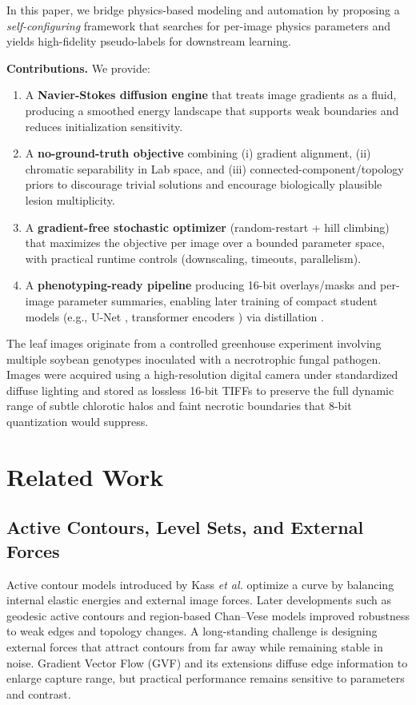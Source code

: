 \documentclass[11pt,a4paper]{article}
\begin{document}
In this paper, we bridge physics-based modeling and automation by proposing a \emph{self-configuring} framework that searches for per-image physics parameters and yields high-fidelity pseudo-labels for downstream learning.

\textbf{Contributions.} We provide:
\begin{enumerate}
    \item A \textbf{Navier-Stokes diffusion engine} that treats image gradients as a fluid, producing a smoothed energy landscape that supports weak boundaries and reduces initialization sensitivity.
    \item A \textbf{no-ground-truth objective} combining (i) gradient alignment, (ii) chromatic separability in Lab space, and (iii) connected-component/topology priors to discourage trivial solutions and encourage biologically plausible lesion multiplicity.
    \item A \textbf{gradient-free stochastic optimizer} (random-restart + hill climbing) that maximizes the objective per image over a bounded parameter space, with practical runtime controls (downscaling, timeouts, parallelism).
    \item A \textbf{phenotyping-ready pipeline} producing 16-bit overlays/masks and per-image parameter summaries, enabling later training of compact student models (e.g., U-Net \citep{ronneberger2015u}, transformer encoders \citep{oquab2023dinov2}) via distillation \citep{hinton2015distilling}.
\end{enumerate}

The leaf images originate from a controlled greenhouse experiment involving multiple soybean genotypes inoculated with a necrotrophic fungal pathogen. Images were acquired using a high-resolution digital camera under standardized diffuse lighting and stored as lossless 16-bit TIFFs to preserve the full dynamic range of subtle chlorotic halos and faint necrotic boundaries that 8-bit quantization would suppress.

\section{Related Work}

\subsection{Active Contours, Level Sets, and External Forces}
Active contour models introduced by Kass \emph{et al.} \citep{kass1988snakes} optimize a curve by balancing internal elastic energies and external image forces. Later developments such as geodesic active contours \citep{caselles1997geodesic} and region-based Chan--Vese models \citep{chan2001active} improved robustness to weak edges and topology changes. A long-standing challenge is designing external forces that attract contours from far away while remaining stable in noise. Gradient Vector Flow (GVF) \citep{xu1998gvf} and its extensions diffuse edge information to enlarge capture range, but practical performance remains sensitive to parameters and contrast.
\end{document}
